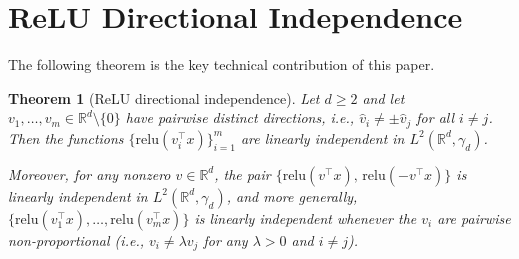 \documentclass[11pt]{amsart}
\newtheorem{theorem}{Theorem}[section]
\theoremstyle{definition}
\newcommand{\R}{\mathbb{R}}
\newcommand{\relu}{\mathrm{relu}}
\begin{document}
\section{ReLU Directional Independence}\label{sec:lemma}

The following theorem is the key technical contribution of this paper.

\begin{theorem}[ReLU directional independence]\label{lem:relu-indep}
Let $d \geq 2$ and let $v_1, \ldots, v_m \in \R^d \setminus \{0\}$ have pairwise distinct directions, i.e., $\hat{v}_i \neq \pm \hat{v}_j$ for all $i \neq j$. Then the functions $\{\relu(v_i^\top x)\}_{i=1}^m$ are linearly independent in $L^2(\R^d, \gamma_d)$.

Moreover, for any nonzero $v \in \R^d$, the pair $\{\relu(v^\top x),\, \relu(-v^\top x)\}$ is linearly independent in $L^2(\R^d, \gamma_d)$, and more generally, $\{\relu(v_1^\top x), \ldots, \relu(v_m^\top x)\}$ is linearly independent whenever the $v_i$ are pairwise non-proportional (i.e., $v_i \neq \lambda v_j$ for any $\lambda > 0$ and $i \neq j$).
\end{theorem}
\end{document}
